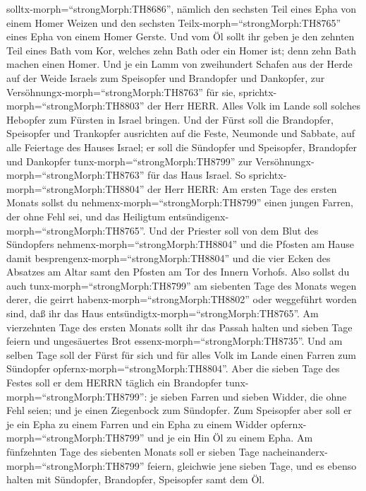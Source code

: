 solltx-morph=``strongMorph:TH8686'', nämlich den sechsten Teil eines
Epha von einem Homer Weizen und den sechsten
Teilx-morph=``strongMorph:TH8765'' eines Epha von einem Homer Gerste.
 Und vom Öl sollt ihr geben je den zehnten Teil eines Bath
vom Kor, welches zehn Bath oder ein Homer ist; denn zehn Bath machen
einen Homer.  Und je ein Lamm von zweihundert Schafen aus
der Herde auf der Weide Israels zum Speisopfer und Brandopfer und
Dankopfer, zur Versöhnungx-morph=``strongMorph:TH8763'' für sie,
sprichtx-morph=``strongMorph:TH8803'' der Herr HERR.  Alles
Volk im Lande soll solches Hebopfer zum Fürsten in Israel bringen.
 Und der Fürst soll die Brandopfer, Speisopfer und
Trankopfer ausrichten auf die Feste, Neumonde und Sabbate, auf alle
Feiertage des Hauses Israel; er soll die Sündopfer und Speisopfer,
Brandopfer und Dankopfer tunx-morph=``strongMorph:TH8799'' zur
Versöhnungx-morph=``strongMorph:TH8763'' für das Haus Israel.
 So sprichtx-morph=``strongMorph:TH8804'' der Herr HERR: Am
ersten Tage des ersten Monats sollst du
nehmenx-morph=``strongMorph:TH8799'' einen jungen Farren, der ohne Fehl
sei, und das Heiligtum entsündigenx-morph=``strongMorph:TH8765''.
 Und der Priester soll von dem Blut des Sündopfers
nehmenx-morph=``strongMorph:TH8804'' und die Pfosten am Hause damit
besprengenx-morph=``strongMorph:TH8804'' und die vier Ecken des Absatzes
am Altar samt den Pfosten am Tor des Innern Vorhofs.  Also
sollst du auch tunx-morph=``strongMorph:TH8799'' am siebenten Tage des
Monats wegen derer, die geirrt habenx-morph=``strongMorph:TH8802'' oder
weggeführt worden sind, daß ihr das Haus
entsündigtx-morph=``strongMorph:TH8765''.  Am vierzehnten
Tage des ersten Monats sollt ihr das Passah halten und sieben Tage
feiern und ungesäuertes Brot essenx-morph=``strongMorph:TH8735''.
 Und am selben Tage soll der Fürst für sich und für alles
Volk im Lande einen Farren zum Sündopfer
opfernx-morph=``strongMorph:TH8804''.  Aber die sieben Tage
des Festes soll er dem HERRN täglich ein Brandopfer
tunx-morph=``strongMorph:TH8799'': je sieben Farren und sieben Widder,
die ohne Fehl seien; und je einen Ziegenbock zum Sündopfer.
 Zum Speisopfer aber soll er je ein Epha zu einem Farren
und ein Epha zu einem Widder opfernx-morph=``strongMorph:TH8799'' und je
ein Hin Öl zu einem Epha.  Am fünfzehnten Tage des
siebenten Monats soll er sieben Tage
nacheinanderx-morph=``strongMorph:TH8799'' feiern, gleichwie jene sieben
Tage, und es ebenso halten mit Sündopfer, Brandopfer, Speisopfer samt
dem Öl.

